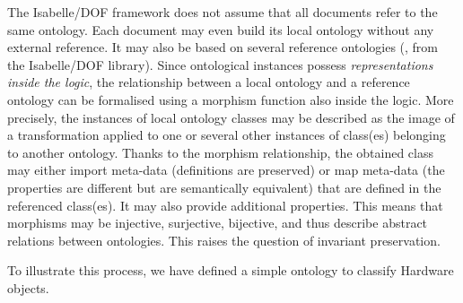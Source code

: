 \begin{isabellebody}
\begin{isamarkuptext}
The Isabelle/DOF framework does not assume that all documents refer to the same ontology. 
Each document may even build its local ontology without any external reference. 
It may also be based on several reference ontologies (\eg, from the  Isabelle/DOF library). 
Since ontological instances possess \emph{representations inside the logic},
the relationship between a local ontology and a reference ontology can be formalised
using a morphism function also inside the logic. More precisely, the instances of local ontology 
classes may be described as the image of a 
transformation applied to one or several other instances of class(es) belonging to another 
ontology. Thanks to the morphism relationship, the obtained class may either import meta-data 
(definitions are preserved)  or map meta-data (the properties are different but 
are semantically equivalent) that are defined in the referenced class(es). 
It may also provide additional properties. This means that morphisms may be injective, 
surjective, bijective, and thus describe abstract relations between ontologies.
This raises the question of invariant preservation.
\end{isamarkuptext}\isamarkuptrue%

\begin{isamarkuptext}
To illustrate this process, we have defined a simple ontology to classify Hardware objects.


\begin{isarbox}


\end{isarbox}
\end{isamarkuptext}
\end{isabellebody}
